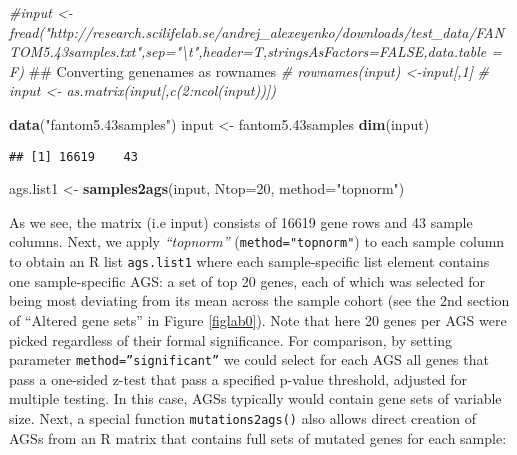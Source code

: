 \documentclass[]{article}
\newenvironment{Shaded}{\begin{snugshade}}{\end{snugshade}}
\newcommand{\KeywordTok}[1]{\textcolor[rgb]{0.13,0.29,0.53}{\textbf{#1}}}
\newcommand{\DataTypeTok}[1]{\textcolor[rgb]{0.13,0.29,0.53}{#1}}
\newcommand{\DecValTok}[1]{\textcolor[rgb]{0.00,0.00,0.81}{#1}}
\newcommand{\StringTok}[1]{\textcolor[rgb]{0.31,0.60,0.02}{#1}}
\newcommand{\CommentTok}[1]{\textcolor[rgb]{0.56,0.35,0.01}{\textit{#1}}}
\newcommand{\NormalTok}[1]{#1}
\begin{document}
\begin{Shaded}
\begin{Highlighting}[]
\CommentTok{#input <- fread("http://research.scilifelab.se/andrej_alexeyenko/downloads/test_data/FANTOM5.43samples.txt",sep="\textbackslash{}t",header=T,stringsAsFactors=FALSE,data.table = F)}
\NormalTok{##  Converting genenames as rownames}
\CommentTok{# rownames(input) <-input[,1]}
\CommentTok{# input <- as.matrix(input[,c(2:ncol(input))])}

\KeywordTok{data}\NormalTok{(}\StringTok{"fantom5.43samples"}\NormalTok{)}
\NormalTok{input <-}\StringTok{ }\NormalTok{fantom5.43samples}
\KeywordTok{dim}\NormalTok{(input)}
\end{Highlighting}
\end{Shaded}

\begin{verbatim}
## [1] 16619    43
\end{verbatim}

\begin{Shaded}
\begin{Highlighting}[]
\NormalTok{ags.list1 <-}\StringTok{ }\KeywordTok{samples2ags}\NormalTok{(input, }\DataTypeTok{Ntop=}\DecValTok{20}\NormalTok{, }\DataTypeTok{method=}\StringTok{"topnorm"}\NormalTok{)}
\end{Highlighting}
\end{Shaded}

As we see, the matrix (i.e input) consists of 16619 gene rows and 43
sample columns. Next, we apply \emph{``topnorm''}
(\texttt{method="topnorm"}) to each sample column to obtain an R list
\texttt{ags.list1} where each sample-specific list element contains one
sample-specific AGS: a set of top 20 genes, each of which was selected
for being most deviating from its mean across the sample cohort (see the
2nd section of ``Altered gene sets'' in Figure \ref{figlab0}). Note that
here 20 genes per AGS were picked regardless of their formal
significance. For comparison, by setting parameter
\texttt{method=”significant”} we could select for each AGS all genes
that pass a one-sided z-test that pass a specified p-value threshold,
adjusted for multiple testing. In this case, AGSs typically would
contain gene sets of variable size. Next, a special function
\texttt{mutations2ags()} also allows direct creation of AGSs from an R
matrix that contains full sets of mutated genes for each sample:

\begin{Shaded}
\end{Shaded}
\end{document}
